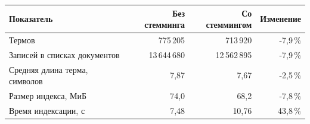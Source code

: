 \begin{tabular}{|l|r|r|r|}
\hline
Показатель & Без стемминга & Со стеммингом & Изменение \\
\hline
Термов & 775\,205 & 713\,920 & -7,9\,\% \\
\hline
Записей в списках документов & 13\,644\,680 & 12\,562\,895 & -7,9\,\% \\
\hline
Средняя длина терма, символов & 7,87 & 7,67 & -2,5\,\% \\
\hline
Размер индекса, МиБ & 74,0 & 68,2 & -7,8\,\% \\
\hline
Время индексации, с & 7,48 & 10,76 & 43,8\,\% \\
\hline
\end{tabular}

